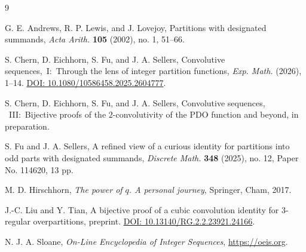 \documentclass[12pt,reqno]{amsart}
\numberwithin{equation}{section}
\theoremstyle{plain}
\theoremstyle{definition}
\theoremstyle{named}
\newcommand{\doi}[1]{\href{https://dx.doi.org/#1}{DOI: #1}}
\begin{document}

\begin{thebibliography}{9}
	
	G. E. Andrews, R. P. Lewis, and J. Lovejoy, Partitions with designated summands, \textit{Acta Arith.} \textbf{105} (2002), no. 1, 51--66.
	
	S. Chern, D. Eichhorn, S. Fu, and J. A. Sellers, Convolutive sequences,~I:~Through the lens of integer partition functions, \textit{Exp. Math.} (2026), 1--14. \doi{10.1080/10586458.2025.2604777}.

    S. Chern, D. Eichhorn, S. Fu, and J. A. Sellers, Convolutive sequences, ~III:~Bijective proofs of the $2$-convolutivity of the PDO function and beyond, in preparation.
	
	S. Fu and J. A. Sellers, A refined view of a curious identity for partitions into odd parts with designated summands, \textit{Discrete Math.} \textbf{348} (2025), no. 12, Paper No. 114620, 13 pp.
	
	M. D. Hirschhorn, \textit{The power of $q$. A personal journey}, Springer, Cham, 2017.
	
	J.-C. Liu and Y. Tian, A bijective proof of a cubic convolution identity for $3$-regular overpartitions, preprint. \doi{10.13140/RG.2.2.23921.24166}.
	
	N. J. A. Sloane, \textit{On-Line Encyclopedia of Integer Sequences}, \url{https://oeis.org}.
	
\end{thebibliography}

\newpage
	
\end{document}
